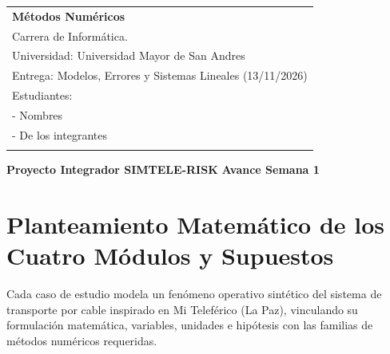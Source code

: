 \documentclass[a4paper,12pt]{article}
\begin{document}
\thispagestyle{empty}

\begin{tabular}{p{15.5cm}}
{\large \bf Métodos Numéricos} \\
Carrera de Informática.\\
Universidad: Universidad Mayor de San Andres\\
Entrega: Modelos, Errores y Sistemas Lineales (13/11/2026) \\
Estudiantes: \\
- Nombres\\
- De los integrantes\\
\hline
\\
\end{tabular}

\vspace*{0.3cm}

\begin{center}
	{\Large \bf  Proyecto Integrador SIMTELE-RISK }
	\vspace{2mm}
	{\bf Avance Semana 1}

\end{center}

\section{Planteamiento Matemático de los Cuatro Módulos y Supuestos}

Cada caso de estudio modela un fenómeno operativo sintético del sistema de transporte por cable inspirado en Mi Teleférico (La Paz), vinculando su formulación matemática, variables, unidades e hipótesis con las familias de métodos numéricos requeridas.
\end{document}
